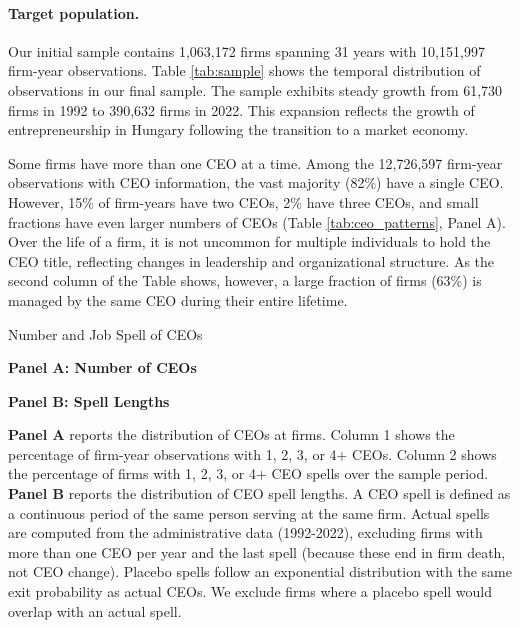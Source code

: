 \paragraph{Target population.} Our initial sample contains 1,063,172 firms spanning 31 years with 10,151,997 firm-year observations. Table \ref{tab:sample} shows the temporal distribution of observations in our final sample. The sample exhibits steady growth from 61,730 firms in 1992 to 390,632 firms in 2022. This expansion reflects the growth of entrepreneurship in Hungary following the transition to a market economy.



Some firms have more than one CEO at a time. Among the 12,726,597 firm-year observations with CEO information, the vast majority (82\%) have a single CEO. However, 15\% of firm-years have two CEOs, 2\% have three CEOs, and small fractions have even larger numbers of CEOs (Table \ref{tab:ceo_patterns}, Panel A). Over the life of a firm, it is not uncommon for multiple individuals to hold the CEO title, reflecting changes in leadership and organizational structure. As the second column of the Table shows, however, a large fraction of firms (63\%) is managed by the same CEO during their entire lifetime.

\begin{table}[htbp]
\centering
\caption{Number and Job Spell of CEOs}
\label{tab:ceo_patterns}
\begin{minipage}{0.48\textwidth}
\centering
\textbf{Panel A: Number of CEOs}

\end{minipage}
\hfill
\begin{minipage}{0.48\textwidth}
\centering
\textbf{Panel B: Spell Lengths}

\end{minipage}
\begin{tablenotes}[flushleft]
\footnotesize
\item\textbf{Panel A} reports the distribution of CEOs at firms. Column 1 shows the percentage of firm-year observations with 1, 2, 3, or 4+ CEOs. Column 2 shows the percentage of firms with 1, 2, 3, or 4+ CEO spells over the sample period. \textbf{Panel B} reports the distribution of CEO spell lengths. A CEO spell is defined as a continuous period of the same person serving at the same firm.
Actual spells are computed from the administrative data (1992-2022), excluding firms with more than one CEO per year and the last spell (because these end in firm death, not CEO change). Placebo spells follow an exponential distribution with the same exit probability as actual CEOs. We exclude firms where a placebo spell would overlap with an actual spell.
\end{tablenotes}
\end{table}


